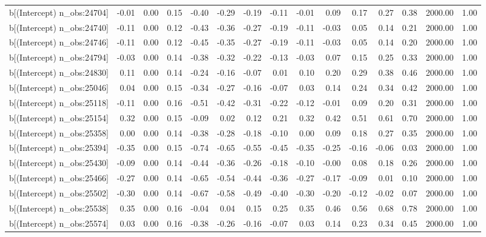 \begin{table}[ht]
\begin{tabular}{rrrrrrrrrrrrrrr}
  b[(Intercept) n\_obs:24704] & -0.01 & 0.00 & 0.15 & -0.40 & -0.29 & -0.19 & -0.11 & -0.01 & 0.09 & 0.17 & 0.27 & 0.38 & 2000.00 & 1.00 \\ 
  b[(Intercept) n\_obs:24740] & -0.11 & 0.00 & 0.12 & -0.43 & -0.36 & -0.27 & -0.19 & -0.11 & -0.03 & 0.05 & 0.14 & 0.21 & 2000.00 & 1.00 \\ 
  b[(Intercept) n\_obs:24746] & -0.11 & 0.00 & 0.12 & -0.45 & -0.35 & -0.27 & -0.19 & -0.11 & -0.03 & 0.05 & 0.14 & 0.20 & 2000.00 & 1.00 \\ 
  b[(Intercept) n\_obs:24794] & -0.03 & 0.00 & 0.14 & -0.38 & -0.32 & -0.22 & -0.13 & -0.03 & 0.07 & 0.15 & 0.25 & 0.33 & 2000.00 & 1.00 \\ 
  b[(Intercept) n\_obs:24830] & 0.11 & 0.00 & 0.14 & -0.24 & -0.16 & -0.07 & 0.01 & 0.10 & 0.20 & 0.29 & 0.38 & 0.46 & 2000.00 & 1.00 \\ 
  b[(Intercept) n\_obs:25046] & 0.04 & 0.00 & 0.15 & -0.34 & -0.27 & -0.16 & -0.07 & 0.03 & 0.14 & 0.24 & 0.34 & 0.42 & 2000.00 & 1.00 \\ 
  b[(Intercept) n\_obs:25118] & -0.11 & 0.00 & 0.16 & -0.51 & -0.42 & -0.31 & -0.22 & -0.12 & -0.01 & 0.09 & 0.20 & 0.31 & 2000.00 & 1.00 \\ 
  b[(Intercept) n\_obs:25154] & 0.32 & 0.00 & 0.15 & -0.09 & 0.02 & 0.12 & 0.21 & 0.32 & 0.42 & 0.51 & 0.61 & 0.70 & 2000.00 & 1.00 \\ 
  b[(Intercept) n\_obs:25358] & 0.00 & 0.00 & 0.14 & -0.38 & -0.28 & -0.18 & -0.10 & 0.00 & 0.09 & 0.18 & 0.27 & 0.35 & 2000.00 & 1.00 \\ 
  b[(Intercept) n\_obs:25394] & -0.35 & 0.00 & 0.15 & -0.74 & -0.65 & -0.55 & -0.45 & -0.35 & -0.25 & -0.16 & -0.06 & 0.03 & 2000.00 & 1.00 \\ 
  b[(Intercept) n\_obs:25430] & -0.09 & 0.00 & 0.14 & -0.44 & -0.36 & -0.26 & -0.18 & -0.10 & -0.00 & 0.08 & 0.18 & 0.26 & 2000.00 & 1.00 \\ 
  b[(Intercept) n\_obs:25466] & -0.27 & 0.00 & 0.14 & -0.65 & -0.54 & -0.44 & -0.36 & -0.27 & -0.17 & -0.09 & 0.01 & 0.10 & 2000.00 & 1.00 \\ 
  b[(Intercept) n\_obs:25502] & -0.30 & 0.00 & 0.14 & -0.67 & -0.58 & -0.49 & -0.40 & -0.30 & -0.20 & -0.12 & -0.02 & 0.07 & 2000.00 & 1.00 \\ 
  b[(Intercept) n\_obs:25538] & 0.35 & 0.00 & 0.16 & -0.04 & 0.04 & 0.15 & 0.25 & 0.35 & 0.46 & 0.56 & 0.68 & 0.78 & 2000.00 & 1.00 \\ 
  b[(Intercept) n\_obs:25574] & 0.03 & 0.00 & 0.16 & -0.38 & -0.26 & -0.16 & -0.07 & 0.03 & 0.14 & 0.23 & 0.34 & 0.45 & 2000.00 & 1.00 \\ 

\end{tabular}
\end{table}
